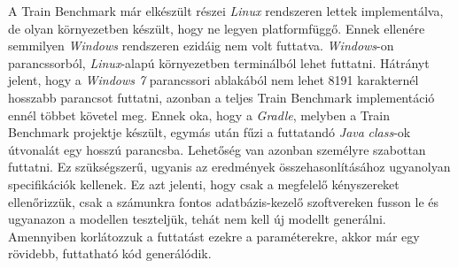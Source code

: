 A Train Benchmark már elkészült részei \emph{Linux} rendszeren lettek implementálva, de olyan környezetben készült, hogy ne legyen platformfüggő. Ennek ellenére semmilyen \emph{Windows} rendszeren ezidáig nem volt futtatva. \emph{Windows}-on parancssorból, \emph{Linux}-alapú környezetben terminálból lehet futtatni. Hátrányt jelent, hogy a \emph{Windows 7} parancssori ablakából nem lehet 8191 karakternél hosszabb parancsot futtatni, azonban a teljes Train Benchmark implementáció ennél többet követel meg. Ennek oka, hogy a \emph{Gradle}, melyben a Train Benchmark projektje készült, egymás után fűzi a futtatandó \emph{Java} \emph{class}-ok útvonalát egy hosszú parancsba. Lehetőség van azonban személyre szabottan futtatni. Ez szükségszerű, ugyanis az eredmények összehasonlításához ugyanolyan specifikációk kellenek. Ez azt jelenti, hogy csak a megfelelő kényszereket ellenőrizzük, csak a számunkra fontos adatbázis-kezelő szoftvereken fusson le és ugyanazon a modellen teszteljük, tehát nem kell új modellt generálni. Amennyiben korlátozzuk a futtatást ezekre a paraméterekre, akkor már egy rövidebb, futtatható kód generálódik.